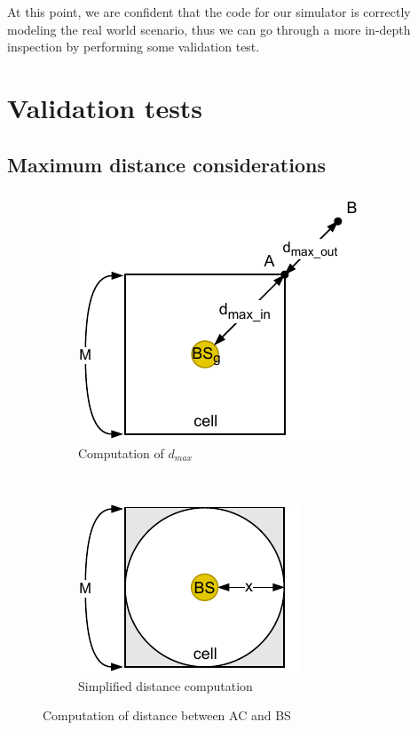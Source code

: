 \documentclass[a4paper,12pt]{article}
\begin{document}
At this point, we are confident that the code for our simulator is correctly modeling the real world scenario, thus we can go through a more in-depth inspection by performing some validation test.

\section{Validation tests}
\subsection{Maximum distance considerations}
\begin{figure}[H]
  \centering
  \begin{subfigure}[b]{0.45\textwidth}
    \centering
    \includegraphics{img/dmax.pdf}
    \caption{Computation of $d_{max}$}
    \label{fig:dmax}
  \end{subfigure}
  ~
  \begin{subfigure}[b]{0.45\textwidth}
    \centering
    \includegraphics{img/d-simplified.pdf}
    \caption{Simplified distance computation}
    \label{fig:d-simplified}
  \end{subfigure}
  \caption{Computation of distance between AC and BS}
  \label{fig:d}
\end{figure}
\end{document}
